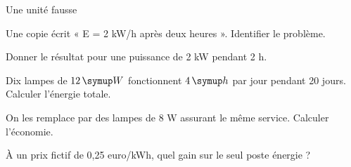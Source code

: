 \par\noindent\begin{minipage}{\linewidth}
\begin{exercice}[3]{Une unité fausse}
\begin{questions}
\item Une copie écrit « E = 2 kW/h après deux heures ». Identifier le problème.
\item Donner le résultat pour une puissance de 2 kW pendant 2 h.
\end{questions}
\end{exercice}
\end{minipage}
\label{defi-ex-15}
\begin{questions}
\item Dix lampes de $12\unite W$ fonctionnent $4\unite h$ par jour pendant 20 jours. Calculer l’énergie totale.
\item On les remplace par des lampes de 8 W assurant le même service. Calculer l’économie.
\item À un prix fictif de 0,25 euro/kWh, quel gain sur le seul poste énergie ?
\end{questions}
\pcGrille
